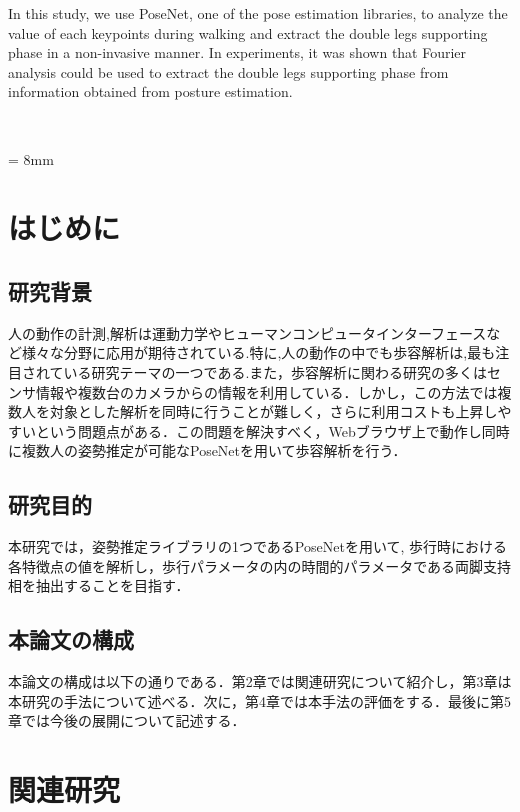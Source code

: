 \documentclass[a4j,10.5pt]{jreport}
\begin{document}
In this study, we use PoseNet, one of the pose estimation libraries, to analyze the value of each keypoints during walking and extract the double legs supporting phase in a non-invasive manner. In experiments, it was shown that Fourier analysis could be used to extract the double legs supporting phase from information obtained from posture estimation.

\tableofcontents

\listoftables %

\listoffigures　%

\baselineskip = 8mm

\clearpage




\chapter{はじめに}
\section{研究背景}
人の動作の計測,解析は運動力学やヒューマンコンピュータインターフェースなど様々な分野に応用が期待されている.特に,人の動作の中でも歩容解析は,最も注目されている研究テーマの一つである.また，歩容解析に関わる研究の多くはセンサ情報や複数台のカメラからの情報を利用している．しかし，この方法では複数人を対象とした解析を同時に行うことが難しく，さらに利用コストも上昇しやすいという問題点がある．この問題を解決すべく，Webブラウザ上で動作し同時に複数人の姿勢推定が可能なPoseNetを用いて歩容解析を行う．
\section{研究目的}
本研究では，姿勢推定ライブラリの1つであるPoseNetを用いて,
歩行時における各特徴点の値を解析し，歩行パラメータの内の時間的パラメータである両脚支持相を抽出することを目指す．

\section{本論文の構成}
本論文の構成は以下の通りである．第2章では関連研究について紹介し，第3章は本研究の手法について述べる．次に，第4章では本手法の評価をする．最後に第5章では今後の展開について記述する．

\chapter{関連研究}
\end{document}

